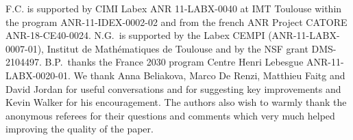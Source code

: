 \documentclass[10pt,a4paper]{amsart}
\numberwithin{equation}{section}
\numberwithin{theorem}{section}
\numberwithin{proposition}{section}
\numberwithin{definition}{section}
\numberwithin{lemma}{section}
\numberwithin{corollary}{section}
\numberwithin{remark}{section}
\numberwithin{example}{section}
\begin{document}
F.C. is supported by CIMI Labex ANR
11-LABX-0040 at IMT Toulouse within the program ANR-11-IDEX-0002-02
and from the french ANR Project CATORE ANR-18-CE40-0024. N.G.\ is
supported by the Labex CEMPI (ANR-11-LABX-0007-01), Institut de
Math\'ematiques de Toulouse and by the NSF grant DMS-2104497. B.P.\ thanks the France 2030 program Centre Henri Lebesgue ANR-11-LABX-0020-01.
We thank Anna Beliakova, Marco De Renzi, Matthieu Faitg and David Jordan for useful conversations and for suggesting key improvements and Kevin Walker for his encouragement.
The authors also wish to warmly thank the anonymous referees for their questions and comments which very much helped improving the quality of the paper.


\end{document}
